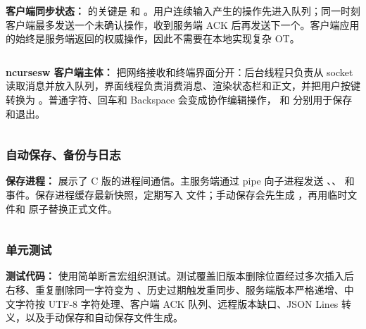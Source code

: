 \textbf{客户端同步状态：} 的关键是  和 。用户连续输入产生的操作先进入队列；同一时刻客户端最多发送一个未确认操作，收到服务端 ACK 后再发送下一个。客户端应用的始终是服务端返回的权威操作，因此不需要在本地实现复杂 OT。

\inputminted[firstline=1,lastline=212,firstnumber=1]{c}{code/cowork/client_state.c}

\textbf{ncursesw 客户端主体：} 把网络接收和终端界面分开：后台线程只负责从 socket 读取消息并放入队列，界面线程负责消费消息、渲染状态栏和正文，并把用户按键转换为 。普通字符、回车和 Backspace 会变成协作编辑操作， 和  分别用于保存和退出。

\inputminted[firstline=1,lastline=490,firstnumber=1]{c}{code/cowork/client.c}

\subsubsection{自动保存、备份与日志}

\textbf{保存进程：} 展示了 C 版的进程间通信。主服务端通过 pipe 向子进程发送 、、 和  事件。保存进程缓存最新快照，定期写入  文件；手动保存会先生成 ，再用临时文件和  原子替换正式文件。

\inputminted[firstline=1,lastline=365,firstnumber=1]{c}{code/cowork/autosave.c}

\subsubsection{单元测试}

\textbf{测试代码：} 使用简单断言宏组织测试。测试覆盖旧版本删除位置经过多次插入后右移、重复删除同一字符变为 、历史过期触发重同步、服务端版本严格递增、中文字符按 UTF-8 字符处理、客户端 ACK 队列、远程版本缺口、JSON Lines 转义，以及手动保存和自动保存文件生成。

\inputminted[firstline=1,lastline=358,firstnumber=1]{c}{code/cowork/tests/test_termsync.c}
